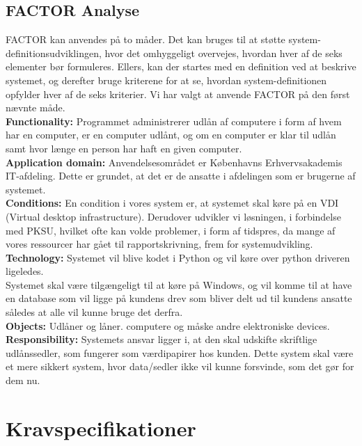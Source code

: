 \documentclass[a4paper]{article}
\begin{document}
\subsection{FACTOR Analyse}
FACTOR kan anvendes på to måder. Det kan bruges til at støtte system-definitionsudviklingen, hvor det omhyggeligt overvejes, hvordan hver af de seks elementer bør formuleres. Ellers, kan der startes med en definition ved at beskrive systemet, og derefter bruge kriterene for at se, hvordan system-definitionen opfylder hver af de seks kriterier. Vi har valgt at anvende FACTOR på den først nævnte måde. \\
\textbf{Functionality:} Programmet administrerer udlån af computere i form af hvem har en computer, er en computer udlånt, og om en computer er klar til udlån samt hvor længe en person har haft en given computer.\\
\textbf{Application domain:} Anvendelsesområdet er Københavns Erhvervsakademis IT-afdeling. Dette er grundet, at det er de ansatte i afdelingen som er brugerne af systemet.\\
\textbf{Conditions:} En condition i vores system er, at systemet skal køre på en VDI (Virtual desktop infrastructure). Derudover udvikler vi løsningen, i forbindelse med PKSU, hvilket ofte kan volde problemer, i form af tidspres, da mange af vores ressourcer har gået til rapportskrivning, frem for systemudvikling.
\textbf{Technology:} Systemet vil blive kodet i Python og vil køre over python driveren ligeledes.\\
Systemet skal være tilgængeligt til at køre på  Windows, og vil komme til at have en database som vil ligge på kundens drev som bliver delt ud til kundens ansatte således at alle vil kunne bruge det derfra.\\
\textbf{Objects:} Udlåner og låner. computere og måske andre elektroniske devices.\\
\textbf{Responsibility:} Systemets ansvar ligger i, at den skal udskifte skriftlige udlånssedler, som fungerer som værdipapirer hos kunden. Dette system skal være et mere sikkert system, hvor data/sedler ikke vil kunne forsvinde, som det gør for dem nu.
\newpage
\section{Kravspecifikationer}
\end{document}
